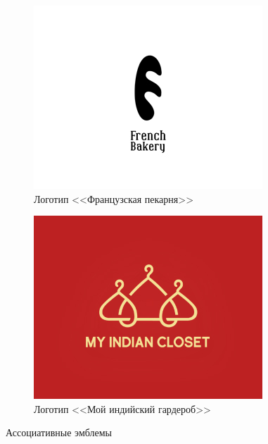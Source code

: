 \begin{figure}[h!]
  \centering
  \begin{subfigure}{.40\textwidth}
    \centering
    \includegraphics[width=\linewidth]{images/frenchb}
    \caption{Логотип <<Французская пекарня>>}

    \label{fig:frenchb}
  \end{subfigure}
  \hfill
  \centering
  \begin{subfigure}{.40\textwidth}
    \centering
    \includegraphics[width=\linewidth]{images/indiancloset}
    \caption{Логотип <<Мой индийский гардероб>>}

    \label{fig:indiancloset}
  \end{subfigure}
   \caption{Ассоциативные эмблемы}
  \end{figure}

